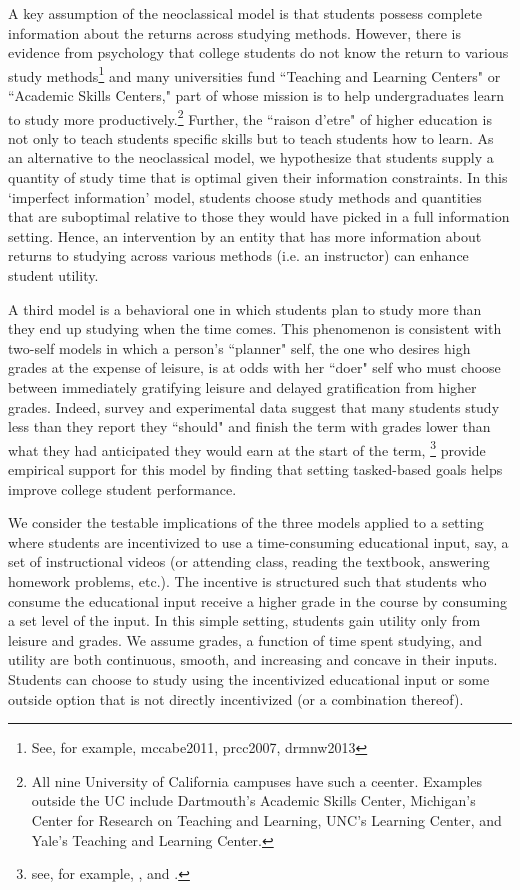 \documentclass[12pt]{article}
\begin{document}
A key assumption of the neoclassical model is that students possess complete information about the returns across studying methods.  However, there is evidence from psychology that college students do not know the return to various study methods\footnote{See, for example, mccabe2011, prcc2007, drmnw2013} and many universities fund ``Teaching and Learning Centers" or ``Academic Skills Centers," part of whose mission is to help undergraduates learn to study more productively.\footnote{All nine University of California campuses have such a ceenter. Examples outside the UC include Dartmouth's Academic Skills Center, Michigan's Center for Research on Teaching and Learning, UNC's Learning Center, and Yale's Teaching and Learning Center.} Further, the ``raison d'etre" of higher education is not only to teach students specific skills but to teach students how to learn.  As an alternative to the neoclassical model, we hypothesize that students supply a quantity of study time that is optimal given their information constraints. In this `imperfect information' model, students choose study methods and quantities that are suboptimal relative to those they would have picked in a full information setting. Hence, an intervention by an entity that has more information about returns to studying across various methods (i.e. an instructor) can enhance student utility. 

A third model is a behavioral one in which students plan to study more than they end up studying when the time comes. This phenomenon is consistent with two-self models in which a person's ``planner" self, the one who desires high grades at the expense of leisure, is at odds with her ``doer" self who must choose between immediately gratifying leisure and delayed gratification from higher grades.  Indeed, survey and experimental data suggest that many students study less than they report they ``should" and finish the term with grades lower than what they had anticipated they would earn at the start of the term,
\footnote{see, for example, \textcite{ferrari1992},  \textcite{ccog2017} and \textcite{llo2016}.}  \textcite{cgpr2020} provide empirical support for this model by finding that setting tasked-based goals helps improve college student performance.

We consider the testable implications of the three models applied to a setting where students are incentivized to use a time-consuming educational input, say, a set of instructional videos (or attending class, reading the textbook, answering homework problems, etc.). The incentive is structured such that students who consume the educational input receive a higher grade in the course by consuming a set level of the input. In this simple setting, students gain utility only from leisure and grades. We assume grades, a function of time spent studying, and utility are both continuous, smooth, and increasing and concave in their inputs. Students can choose to study using the incentivized educational input or some outside option that is not directly incentivized (or a combination thereof).
\end{document}
